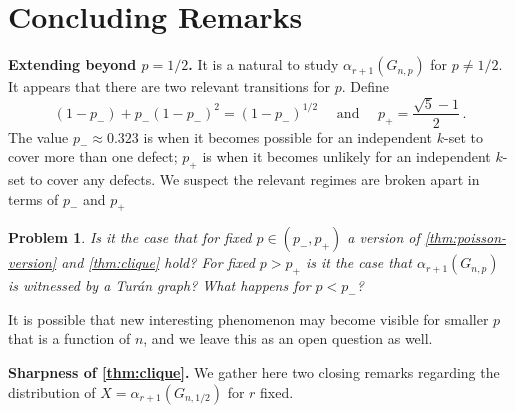 \documentclass[11pt]{article}
\newtheorem{problem}[theorem]{Problem}
\theoremstyle{definition}
\theoremstyle{remark}
\begin{document}
\section{Concluding Remarks}

\textbf{Extending beyond $p = 1/2$.} 
%
It is a natural to study 
$\alpha_{r+1}(G_{n,p})$ for $p \ne 1/2$. It appears that there are two relevant transitions for $p$.  Define \begin{equation*}
    (1 - p_-) + p_-(1 - p_-)^2 = (1 - p_-)^{1/2} \quad \text{ and } \quad p_+ = \frac{\sqrt{5} - 1}{2}\,.
\end{equation*}
The value $p_- \approx 0.323$ is when it becomes possible for an independent $k$-set to cover more than one defect; $p_+$ is when it becomes unlikely for an independent $k$-set to cover any defects.  We suspect the relevant regimes are broken apart in terms of $p_-$ and $p_+$

\begin{problem}
    Is it the case that for fixed $p \in (p_-,p_+)$ a version of \cref{thm:poisson-version} and \cref{thm:clique} hold?  For fixed $p > p_+$ is it the case that $\alpha_{r+1}(G_{n,p})$ is witnessed by a Tur\'an graph?  What happens for $p < p_-$?
\end{problem}

It is possible that new interesting phenomenon may become visible for smaller $p$ that is a function of $n$, and we leave this as an open question as well.



\textbf{Sharpness of \cref{thm:clique}.} We gather here two closing remarks regarding the distribution of $ X = \alpha_{r+1}( G_{n,1/2})$ for $r$ fixed. 
\end{document}
